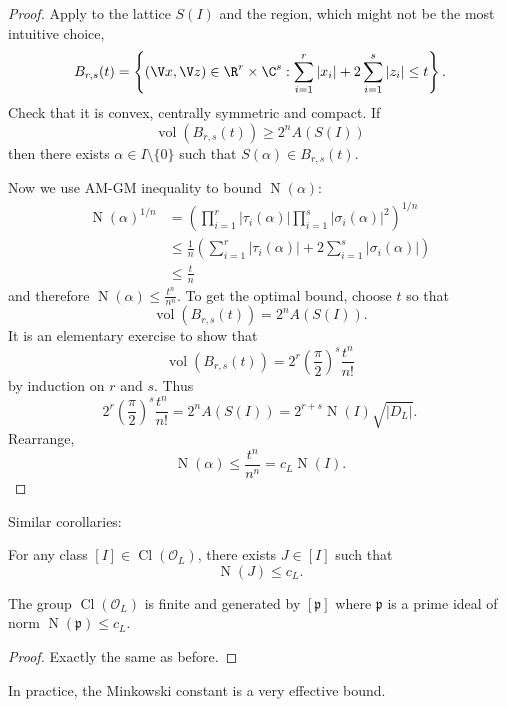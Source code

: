 \documentclass[a4paper]{article}
\renewcommand*{\O}{\mathcal{O}}
\DeclareMathOperator{\n}{N}
\DeclareMathOperator{\Cl}{Cl}%
\DeclareMathOperator{\vol}{vol}
\begin{document}
\begin{proof}
  Apply  to the lattice \(S(I)\) and the region, which might not be the most intuitive choice,
  \[
    B_{r, s}(t) = \left\{ (\V x, \V z) \in \R^r \times \C^s: \sum_{i = 1}^r |x_i| + 2 \sum_{i = 1}^s |z_i| \leq t \right\}.
  \]
  Check that it is convex, centrally symmetric and compact. If
  \[
    \vol(B_{r, s}(t)) \geq 2^n A(S(I))
  \]
  then there exists \(\alpha \in I \setminus \{0\}\) such that \(S(\alpha) \in B_{r, s}(t)\).

  Now we use AM-GM inequality to bound \(\n(\alpha)\):
  \begin{align*}
    \n(\alpha)^{1/n}
    &= \left( \prod_{i = 1}^r |\tau_i(\alpha)| \prod_{i = 1}^s |\sigma_i(\alpha)|^2 \right)^{1/n} \\
    &\leq \frac{1}{n} \left( \sum_{i = 1}^r |\tau_i(\alpha)| + 2 \sum_{i = 1}^s |\sigma_i(\alpha)| \right) \\
    &\leq \frac{t}{n}
  \end{align*}
  and therefore \(\n(\alpha) \leq \frac{t^n}{n^n}\). To get the optimal bound, choose \(t\) so that
  \[
    \vol(B_{r, s}(t)) = 2^nA(S(I)).
  \]
  It is an elementary exercise to show that
  \[
    \vol(B_{r, s}(t)) = 2^r \left( \frac{\pi}{2} \right)^s \frac{t^n}{n!}
  \]
  by induction on \(r\) and \(s\). Thus
  \[
    2^r \left( \frac{\pi}{2} \right)^s \frac{t^n}{n!} = 2^n A(S(I)) = 2^{r + s} \n(I) \sqrt{|D_L|}.
  \]
  Rearrange,
  \[
    \n(\alpha) \leq \frac{t^n}{n^n} = c_L \n(I).
  \]
\end{proof}

Similar corollaries:

\begin{corollary}
  For any class \([I] \in \Cl(\O_L)\), there exists \(J \in [I]\) such that
  \[
    \n(J) \leq c_L.
  \]
\end{corollary}

\begin{corollary}
  The group \(\Cl(\O_L)\) is finite and generated by \([\mathfrak{p}]\) where \(\mathfrak{p}\) is a prime ideal of norm \(\n(\mathfrak{p}) \leq c_L\).
\end{corollary}

\begin{proof}
  Exactly the same as before.
\end{proof}

\begin{remark}
  In practice, the Minkowski constant is a very effective bound.
\end{remark}
\end{document}
